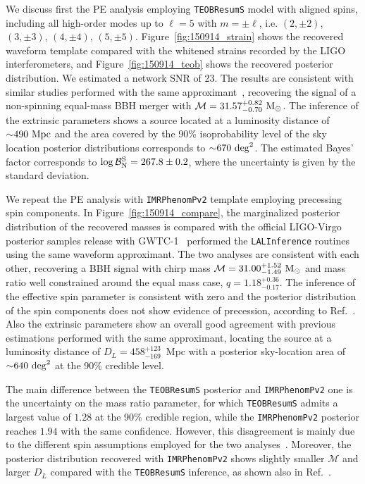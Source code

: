 \documentclass[prd,aps,twocolumn,a4paper,showkeys,nofootinbib,floatfix]{revtex4-1}
\def\M{\mathcal{M}}
\def\B{\mathcal{B}}
\def\Mo{{\rm M_{\odot}}}
\begin{document}
We discuss first the PE analysis employing {\tt TEOBResumS} model with aligned spins,
including all high-order modes up to $\ell=5$ with $m=\pm \ell$, 
i.e. $(2,\pm 2)$, $(3,\pm 3)$, $(4,\pm 4)$, $(5,\pm 5)$.
Figure~\ref{fig:150914_strain} shows the recovered waveform template 
compared with the whitened strains recorded by the LIGO interferometers,
and
Figure~\ref{fig:150914_teob} shows the recovered posterior distribution.
We estimated a network SNR of 23.
The results are consistent with similar studies performed with the 
same approximant~\cite{Nagar:2018zoe,Nagar:2020pcj},
recovering the signal of a non-spinning equal-mass BBH merger 
with $\M=31.57^{+0.82}_{-0.70}~\Mo$.
The inference of the extrinsic parameters shows a source located 
at a luminosity distance of ${\sim}490~{\rm Mpc}$ and
the area covered by the 90\% isoprobability level 
of the sky location posterior distributions 
corresponds to ${\sim}670~{\rm deg}^2$.
The estimated Bayes' factor corresponds to
$\log \B^{\rm S}_{\rm N}=267.8\pm0.2$,
where the uncertainty is given by the standard deviation.

We repeat the PE analysis with
{\tt IMRPhenomPv2} template employing precessing spin components.
In Figure~\ref{fig:150914_compare},
the marginalized posterior distribution of the recovered masses
 is compared with the official LIGO-Virgo
posterior samples release with GWTC-1~\cite{LIGOScientific:2018mvr}
performed the {\tt LALInference} routines~\cite{Veitch:2014wba,lalsuite}
using the same waveform approximant.
The two analyses are consistent with each other,
recovering a BBH signal with chirp mass $\M=31.00^{+1.52}_{-1.49}~\Mo$
and mass ratio well constrained around the equal mass case, $q=1.18^{+0.36}_{-0.17}$.
The inference of the effective spin parameter
is consistent with zero and the posterior distribution 
of the spin components does not show evidence of precession,
according to Ref.~\cite{Abbott:2016izl,TheLIGOScientific:2016wfe,TheLIGOScientific:2016htt}.
Also the extrinsic parameters show an overall good agreement with 
previous estimations performed with the same approximant,
locating the source at a
luminosity distance of $D_L=458^{+123}_{-169}$~Mpc
with a posterior sky-location area of ${\sim}640~{\rm deg}^2$ at the 90\% credible level.

The main difference between the {\tt TEOBResumS} posterior 
and {\tt IMRPhenomPv2} one is the uncertainty on the mass ratio parameter, 
for which {\tt TEOBResumS} admits a largest value of $1.28$ at the 90\% credible region,
while the {\tt IMRPhenomPv2} posterior reaches $1.94$ with the same confidence.
However, this disagreement is mainly due to the different spin assumptions employed for 
the two analyses~\cite{Abbott:2016izl,TheLIGOScientific:2016wfe}.
Moreover, the posterior distribution recovered with {\tt IMRPhenomPv2} 
shows slightly smaller $\M$ and larger $D_L$ compared with the {\tt TEOBResumS} inference,
as shown also in Ref.~\cite{Nagar:2018zoe}.
\end{document}
